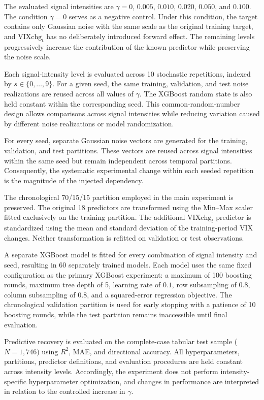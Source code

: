 \documentclass[utf8]{FrontiersinHarvard} %
\begin{document}
The evaluated signal intensities are \(\gamma=0\), \(0.005\), \(0.010\), \(0.020\), \(0.050\), and \(0.100\). The condition \(\gamma=0\) serves as a negative control. Under this condition, the target contains only Gaussian noise with the same scale as the original training target, and \(\mathrm{VIXchg}_t\) has no deliberately introduced forward effect. The remaining levels progressively increase the contribution of the known predictor while preserving the noise scale.

Each signal-intensity level is evaluated across 10 stochastic repetitions, indexed by \(s\in\{0,\ldots,9\}\). For a given seed, the same training, validation, and test noise realizations are reused across all values of \(\gamma\). The XGBoost random state is also held constant within the corresponding seed. This common-random-number design allows comparisons across signal intensities while reducing variation caused by different noise realizations or model randomization.

For every seed, separate Gaussian noise vectors are generated for the training, validation, and test partitions. These vectors are reused across signal intensities within the same seed but remain independent across temporal partitions. Consequently, the systematic experimental change within each seeded repetition is the magnitude of the injected dependency.

The chronological 70/15/15 partition employed in the main experiment is preserved. The original 18 predictors are transformed using the Min--Max scaler fitted exclusively on the training partition. The additional \(\mathrm{VIXchg}_t\) predictor is standardized using the mean and standard deviation of the training-period VIX changes. Neither transformation is refitted on validation or test observations.

A separate XGBoost model is fitted for every combination of signal intensity and seed, resulting in 60 separately trained models. Each model uses the same fixed configuration as the primary XGBoost experiment: a maximum of 100 boosting rounds, maximum tree depth of 5, learning rate of \(0.1\), row subsampling of \(0.8\), column subsampling of \(0.8\), and a squared-error regression objective. The chronological validation partition is used for early stopping with a patience of 10 boosting rounds, while the test partition remains inaccessible until final evaluation.

Predictive recovery is evaluated on the complete-case tabular test sample (\(N=1{,}746\)) using \(R^2\), MAE, and directional accuracy. All hyperparameters, partitions, predictor definitions, and evaluation procedures are held constant across intensity levels. Accordingly, the experiment does not perform intensity-specific hyperparameter optimization, and changes in performance are interpreted in relation to the controlled increase in \(\gamma\).
\end{document}
